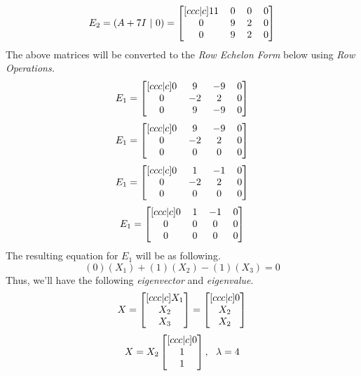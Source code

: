 \documentclass[12pt]{article}
\numberwithin{equation}{section}
\numberwithin{table}{section}
\numberwithin{figure}{section}
\begin{document}
\begin{equation}\label{eq:2.6}	
	E_2 = (A + 7I \ | \ 0) = 
	\renewcommand\arraystretch{1}
	\setlength\arraycolsep{6pt}
		\begin{bmatrix}[ccc|c]
		11 & 0 & 0 & 0\\	
		0 & 9 & 2 & 0\\
		0 & 9 & 2 & 0\\
		\end{bmatrix}
\end{equation}
The above matrices will be converted to the \textit{Row Echelon Form} below using \textit{Row Operations.}
$$
	E_1 = 
		\renewcommand\arraystretch{1}
		\setlength\arraycolsep{6pt}
		\begin{bmatrix}[ccc|c]
		0 & 9 & -9 & 0\\	
		0 & -2 & 2 & 0\\
		0 & 9 & -9 & 0\\
		\end{bmatrix}
$$
$$
	E_1 = 
		\renewcommand\arraystretch{1}
		\setlength\arraycolsep{6pt}
		\begin{bmatrix}[ccc|c]
		0 & 9 & -9 & 0\\	
		0 & -2 & 2 & 0\\
		0 & 0 & 0 & 0\\
		\end{bmatrix}
$$
$$
	E_1 = 
	\renewcommand\arraystretch{1}
	\setlength\arraycolsep{6pt}
	\begin{bmatrix}[ccc|c]
	0 & 1 & -1 & 0\\	
	0 & -2 & 2 & 0\\
	0 & 0 & 0 & 0\\
	\end{bmatrix}
$$
$$
E_1 = 
\renewcommand\arraystretch{1}
\setlength\arraycolsep{6pt}
\begin{bmatrix}[ccc|c]
0 & 1 & -1 & 0\\	
0 & 0 & 0 & 0\\
0 & 0 & 0 & 0\\
\end{bmatrix}
$$
The resulting equation for $E_1$ will be as following.
$$
	(0)(X_1) + (1)(X_2) - (1)(X_3) = 0
$$
Thus, we'll have the following \textit{eigenvector} and \textit{eigenvalue}.
$$
	X = 
		\renewcommand\arraystretch{1}
		\setlength\arraycolsep{6pt}
		\begin{bmatrix}[ccc|c]
		X_1\\	
		X_2\\
		X_3\\
		\end{bmatrix} = \renewcommand\arraystretch{1}
		\setlength\arraycolsep{6pt}
		\begin{bmatrix}[ccc|c]
		0\\	
		X_2\\
		X_2\\
		\end{bmatrix}
$$
$$
	X =  X_2 \renewcommand\arraystretch{1}
	\setlength\arraycolsep{6pt}
	\begin{bmatrix}[ccc|c]
	0\\	
	1\\
	1\\
	\end{bmatrix} , \ \ \lambda = 4
$$
\end{document}
